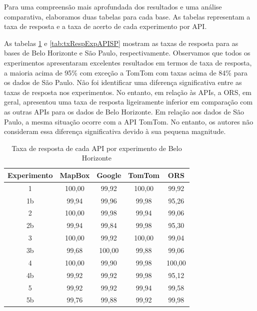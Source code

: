 Para uma compreensão mais aprofundada dos resultados e uma análise comparativa, elaboramos duas tabelas para cada base. As tabelas representam a taxa de resposta e a taxa de acerto de cada experimento por API.

As tabelas \ref{tab:txRespExpAPIBH} e \ref{tab:txRespExpAPISP} mostram as taxas de resposta para as bases de Belo Horizonte e São Paulo, respectivamente. Observamos que todos os experimentos apresentaram excelentes resultados em termos de taxa de resposta, a maioria acima de 95\% com exceção a TomTom com taxas acima de 84\% para os dados de São Paulo. Não foi identificar uma diferença significativa entre as taxas de resposta nos experimentos. No entanto, em relação às APIs, a ORS, em geral, apresentou uma taxa de resposta ligeiramente inferior em comparação com as outras APIs para os dados de Belo Horizonte. Em relação aos dados de São Paulo, a mesma situação ocorre com a API TomTom. No entanto, os autores não consideram essa diferença significativa devido à sua pequena magnitude.
 
\begin{table}[!ht]
    \centering
    \caption{Taxa de resposta de cada API por experimento de Belo Horizonte}
    \label{tab:txRespExpAPIBH}
    \begin{adjustbox}{width=0.7\textwidth}
    \begin{tabular}{|c|c|c|c|c|}
    \hline
    Experimento & MapBox & Google & TomTom & ORS\\
    \hline
    1 & 100,00 & 99,92 & 100,00 & 99,92\\
    \hline
    1b & 99,94 & 99,96 & 99,98 & 95,26 \\
    \hline
    2 & 100,00 & 99,98 & 99,94 & 99,06\\
    \hline
    2b & 99,94 & 99,84 & 99,98 & 95,30\\
    \hline
    3 & 100,00 & 99,92 & 100,00 & 99,04\\
    \hline
    3b & 99,68 & 100,00 & 99,88 & 99,06\\
    \hline
    4 & 100,00 & 99,90 & 99,98 & 100,00\\
    \hline
    4b & 99,92 & 99,92 & 99,98 & 95,12\\
    \hline
    5 & 99,92 & 99,92 & 99,94 & 99,58\\
    \hline
    5b & 99,76 & 99,88 & 99,92 & 99,98\\
    \hline
    \end{tabular}
    \end{adjustbox}
\end{table}

